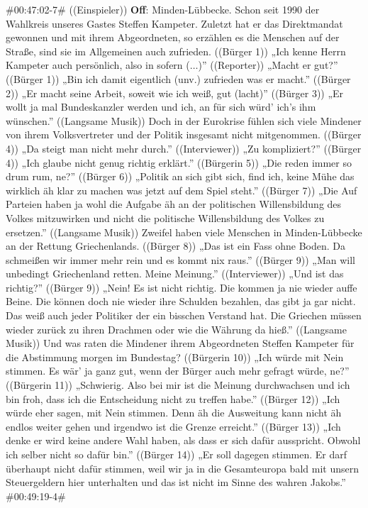 \begin{description}
\begin{linenumbers}[1]
		\item \#00:47:02-7\# ((Einspieler)) \textbf{Off}: Minden-Lübbecke. Schon seit 1990 der Wahlkreis unseres Gastes Steffen Kampeter. Zuletzt hat er das Direktmandat gewonnen und mit ihrem Abgeordneten, so erzählen es die Menschen auf der Straße, sind sie im Allgemeinen auch zufrieden. ((Bürger 1)) „Ich kenne Herrn Kampeter auch persönlich, also in sofern ($\ldots$)” ((Reporter)) „Macht er gut?” ((Bürger 1)) „Bin ich damit eigentlich (unv.) zufrieden was er macht.” ((Bürger 2)) „Er macht seine Arbeit, soweit wie ich weiß, gut (lacht)” ((Bürger 3)) „Er wollt ja mal Bundeskanzler werden und ich, an für sich würd' ich's ihm wünschen.” ((Langsame Musik)) Doch in der Eurokrise fühlen sich viele Mindener von ihrem Volksvertreter und der Politik insgesamt nicht mitgenommen. ((Bürger 4)) „Da steigt man nicht mehr durch.” ((Interviewer)) „Zu kompliziert?” ((Bürger 4)) „Ich glaube nicht genug richtig erklärt.” ((Bürgerin 5)) „Die reden immer so drum rum, ne?” ((Bürger 6)) „Politik an sich gibt sich, find ich, keine Mühe das wirklich äh klar zu machen was jetzt auf dem Spiel steht.” ((Bürger 7)) „Die Auf Parteien haben ja wohl die Aufgabe äh an der politischen Willensbildung des Volkes mitzuwirken und nicht die politische Willensbildung des Volkes zu ersetzen.” ((Langsame Musik)) Zweifel haben viele Menschen in Minden-Lübbecke an der Rettung Griechenlands. ((Bürger 8)) „Das ist ein Fass ohne Boden. Da schmeißen wir immer mehr rein und es kommt nix raus.” ((Bürger 9)) „Man will unbedingt Griechenland retten. Meine Meinung.” ((Interviewer)) „Und ist das richtig?” ((Bürger 9)) „Nein! Es ist nicht richtig. Die kommen ja nie wieder auffe Beine. Die können doch nie wieder ihre Schulden bezahlen, das gibt ja gar nicht. Das weiß auch jeder Politiker der ein bisschen Verstand hat. Die Griechen müssen wieder zurück zu ihren Drachmen oder wie die Währung da hieß.” ((Langsame Musik)) Und was raten die Mindener ihrem Abgeordneten Steffen Kampeter für die Abstimmung morgen im Bundestag? ((Bürgerin 10)) „Ich würde mit Nein stimmen. Es wär' ja ganz gut, wenn der Bürger auch mehr gefragt würde, ne?” ((Bürgerin 11)) „Schwierig. Also bei mir ist die Meinung durchwachsen und ich bin froh, dass ich die Entscheidung nicht zu treffen habe.” ((Bürger 12)) „Ich würde eher sagen, mit Nein stimmen. Denn äh die Ausweitung kann nicht äh endlos weiter gehen und irgendwo ist die Grenze erreicht.” ((Bürger 13)) „Ich denke er wird keine andere Wahl haben, als dass er sich dafür ausspricht. Obwohl ich selber nicht so dafür bin.” ((Bürger 14)) „Er soll dagegen stimmen. Er darf überhaupt nicht dafür stimmen, weil wir ja in die Gesamteuropa bald mit unsern Steuergeldern hier unterhalten und das ist nicht im Sinne des wahren Jakobs.” \#00:49:19-4\#
		

\end{linenumbers}
\end{description}

